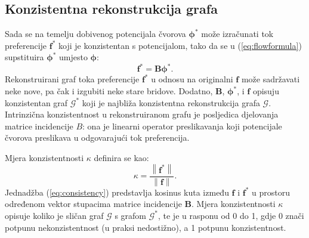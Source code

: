 \documentclass[lmodern, utf8, diplomski, numeric]{fer}
\newcommand{\matr}[1]{\mathbold{#1}}
\newcommand{\graph}[1]{\mathcal{#1}}
\newcommand{\q}{\left}
\newcommand{\w}{\right}
\begin{document}
  \subsection{Konzistentna rekonstrukcija grafa}
  \label{sec:reconstruct}
  Sada se na temelju dobivenog potencijala čvorova $\matr{\phi^*}$ može izračunati tok preferencije $\matr{f^*}$ koji je konzistentan s potencijalom, tako da se u (\ref{eq:flowformula}) supstituira $\matr{\phi^*}$ umjesto $\matr{\phi}$:
  \begin{equation}
  \matr{f^*} = \matr{B} \matr{\phi^*}.
  \end{equation}
  Rekonstruirani graf toka preferencije $\matr{f^*}$ u odnosu na originalni $\matr{f}$ može sadržavati neke nove, pa čak i izgubiti neke stare bridove.
  Dodatno, $\matr{B}$, $\matr{\phi^*}$, i $\matr{f}$ opisuju konzistentan graf $\graph{G}^*$ koji je najbliža konzistentna rekonstrukcija grafa $\graph{G}$.
  Intrinzična konzistentnost u rekonstruiranom grafu je posljedica djelovanja matrice incidencije $B$: ona je linearni operator preslikavanja koji potencijale čvorova preslikava u odgovarajući tok preferencija.
  
  Mjera konzistentnosti $\kappa$ definira se kao:
  \begin{equation}
  \label{eq:consistency}
  \kappa = \frac{\q \lVert \matr{f^*} \w \rVert}{\q \lVert \matr{f} \w \rVert}.
  \end{equation}
  Jednadžba (\ref{eq:consistency}) predstavlja kosinus kuta između $\matr{f}$ i $\matr{f^*}$ u prostoru određenom vektor stupacima matrice incidencije $\matr{B}$.
  Mjera konzistentnosti $\kappa$ opisuje koliko je sličan graf $\graph{G}$ s grafom $\graph{G}^*$, te je u rasponu od 0 do 1, gdje 0 znači potpunu nekonzistentnost (u praksi nedostižno), a 1 potpunu konzistentnost.
  
\end{document}

